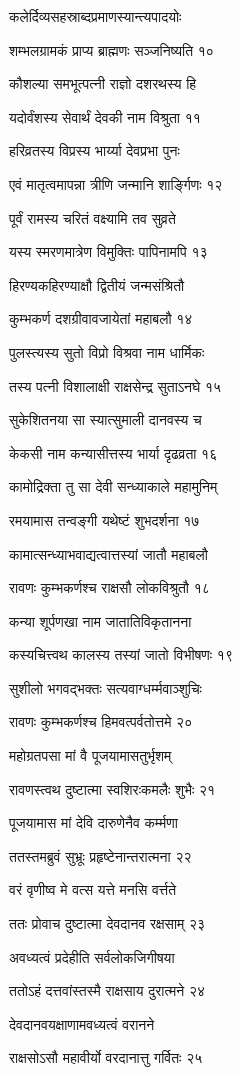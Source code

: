 कलेर्दिव्यसहस्राब्दप्रमाणस्यान्त्यपादयोः

शम्भलग्रामकं प्राप्य ब्राह्मणः सञ्जनिष्यति १०

कौशल्या समभूत्पत्नी राज्ञो दशरथस्य हि

यदोर्वंशस्य सेवार्थं देवकी नाम विश्रुता ११

हरिव्रतस्य विप्रस्य भार्य्या देवप्रभा पुनः

एवं मातृत्वमापन्ना त्रीणि जन्मानि शार्ङ्गिणः १२

पूर्वं रामस्य चरितं वक्ष्यामि तव सुव्रते

यस्य स्मरणमात्रेण विमुक्तिः पापिनामपि १३

हिरण्यकहिरण्याक्षौ द्वितीयं जन्मसंश्रितौ

कुम्भकर्ण दशग्रीवावजायेतां महाबलौ १४

पुलस्त्यस्य सुतो विप्रो विश्रवा नाम धार्मिकः

तस्य पत्नी विशालाक्षी राक्षसेन्द्र सुताऽनघे १५

सुकेशितनया सा स्यात्सुमाली दानवस्य च

केकसी नाम कन्यासीत्तस्य भार्या दृढव्रता १६

कामोद्रिक्ता तु सा देवी सन्ध्याकाले महामुनिम्

रमयामास तन्वङ्गी यथेष्टं शुभदर्शना १७

कामात्सन्ध्याभवाद्यत्वात्तस्यां जातौ महाबलौ

रावणः कुम्भकर्णश्च राक्षसौ लोकविश्रुतौ १८

कन्या शूर्पणखा नाम जातातिविकृतानना

कस्यचित्त्वथ कालस्य तस्यां जातो विभीषणः १९

सुशीलो भगवद्भक्तः सत्यवाग्धर्म्मवाञ्शुचिः

रावणः कुम्भकर्णश्च हिमवत्पर्वतोत्तमे २०

महोग्रतपसा मां वै पूजयामासतुर्भृशम्

रावणस्त्वथ दुष्टात्मा स्वशिरःकमलैः शुभैः २१

पूजयामास मां देवि दारुणेनैव कर्म्मणा

ततस्तमब्रुवं सुभ्रूः प्रहृष्टेनान्तरात्मना २२

वरं वृणीष्व मे वत्स यत्ते मनसि वर्त्तते

ततः प्रोवाच दुष्टात्मा देवदानव रक्षसाम् २३

अवध्यत्वं प्रदेहीति सर्वलोकजिगीषया

ततोऽहं दत्तवांस्तस्मै राक्षसाय दुरात्मने २४

देवदानवयक्षाणामवध्यत्वं वरानने

राक्षसोऽसौ महावीर्यो वरदानात्तु गर्वितः २५

